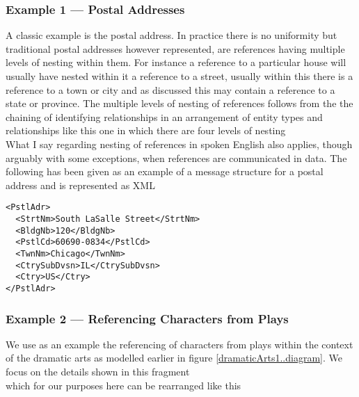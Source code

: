 \subsubsection{Example 1 --- Postal Addresses}
\mynote
A classic example is the postal address. 
In practice there is no uniformity  but traditional postal addresses however
represented, are references having multiple levels of nesting within them.
For instance a reference to a particular house will usually have nested within it a reference to a street, usually within this there is a reference to a town or city and
as discussed this may contain a reference to a state or province.  
The multiple levels of nesting of references follows from the
the chaining of identifying relationships in an arrangement
of entity types and relationships like this one in which there are four levels of nesting
\begin{equation*}

\end{equation*}
\mynote
What I say regarding nesting of references in spoken English also applies, though arguably with some exceptions, when references are communicated in data.
The following has been given as an example of a message structure for a postal address and is represented as XML
\begin{verbatim}
<PstlAdr>
  <StrtNm>South LaSalle Street</StrtNm>
  <BldgNb>120</BldgNb>
  <PstlCd>60690-0834</PstlCd>
  <TwnNm>Chicago</TwnNm>
  <CtrySubDvsn>IL</CtrySubDvsn>
  <Ctry>US</Ctry>
</PstlAdr>
\end{verbatim}

\subsubsection{Example 2 --- Referencing Characters from Plays}
\label{exampleReferencingCharacters}
\mynote
 We use as an example the referencing of characters from  plays
 within the context of  the  dramatic arts
   as modelled earlier in figure \ref{dramaticArts1..diagram}.
We focus on the details shown in this fragment 
\begin{equation*}

\end{equation*}
which for our purposes here can be rearranged like this

\begin{equation*}

\end{equation*}

